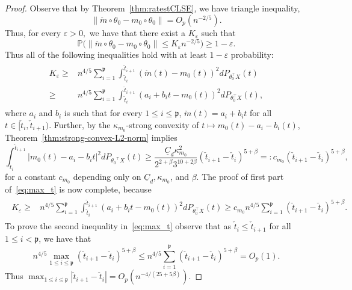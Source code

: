 {\begin{proof}
Observe that  by Theorem~\ref{thm:ratestCLSE}, we have triangle inequality, 
\[\|\check{m}\circ{\theta_0}- m_0\circ{\theta_0}\| =O_p(n^{-2/5}).\]
Thus, for every $\varepsilon>0,$ we have that there exist a $K_\varepsilon$ such that 
\begin{equation}\label{eq:K_ep_def}
 \mathbb{P}\big(\|\check{m}\circ{\theta_0}- m_0\circ{\theta_0}\| \le K_\varepsilon n^{-2/5}) \ge 1-\varepsilon.
 \end{equation}
 { Thus all of the following inequalities hold with at least $1-\varepsilon$ probability:
 \begin{align}\label{eq:max_kink}
 \begin{split}
 K_\varepsilon \ge{}& n^{4/5} \sum_{i=1}^\mathfrak{p} \int_{\check{t}_i}^{\check{t}_{i+1}} (\check{m}(t) -m_0(t))^2 dP_{\theta_0^\top X}(t)\\
 \ge{}& n^{4/5}\sum_{i=1}^\mathfrak{p} \int_{\check{t}_i}^{\check{t}_{i+1}} ( a_i + b_i t  -m_0(t))^2 dP_{\theta_0^\top X}(t),
 \end{split}
 \end{align}
 where $a_i$ and $b_i$ is such that for every $1\le i\le \mathfrak{p}$, $\check{m}(t) = a_i + b_i t$ for all $t\in [\check{t}_i, \check{t}_{i+1}).$
 Further, by the $\kappa_{m_0}$-strong convexity of $t\mapsto m_0(t) - a_i - b_i(t)$, Theorem~\ref{thm:strong-convex-L2-norm} implies
 \[
 \int_{\check{t}_{i}}^{\check{t}_{i+1}}|m_0(t) - a_i - b_i t|^2 dP_{{\theta_0}^{\top}X}(t) \ge \frac{\underline{C}_d\kappa_{m_0}^2}{2^{2+\beta}3^{10 + 2\beta}} (\check{t}_{i+1}- \check{t}_{i})^{5 + \beta} =: c_{m_0}(\check{t}_{i+1}- \check{t}_{i})^{5 + \beta},
 \]
 for a constant $c_{m_0}$ depending only on $\underline{C}_d, \kappa_{m_0}$, and $\beta$.
 The proof of first part of~\eqref{eq:max_t} is now complete, because
 \begin{align}\label{eq:max_kink_1}
 \begin{split}
 K_\varepsilon \ge{}& n^{4/5}\sum_{i=1}^\mathfrak{p} \int_{\check{t}_i}^{\check{t}_{i+1}} ( a_i + b_i t  -m_0(t))^2 dP_{\theta_0^\top X}(t)
 \ge{} c_{m_0}n^{4/5}\sum_{i=1}^\mathfrak{p} (\check{t}_{i+1}- \check{t}_{i})^{5+\beta}.
 \end{split}
 \end{align}}
To prove the second inequality in~\eqref{eq:max_t} observe that  as $\check{t}_{i}\le  \check{t}_{i+1} $ for all $1\le i < \mathfrak{p}$, we have that
\[
n^{4/5}\max_{1\le i \le \mathfrak{p}} (\check{t}_{i+1}- \check{t}_{i})^{5+\beta} \le n^{4/5}\sum_{i=1}^\mathfrak{p}  (\check{t}_{i+1}- \check{t}_{i})^{5+\beta} =O_p(1).
\]
Thus 
$\max_{1\le i \le \mathfrak{p}} |\check{t}_{i+1}- \check{t}_{i}| = O_p(n^{-4/(25 + 5\beta)}).$%


\end{proof}}
